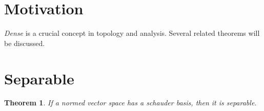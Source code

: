 \documentclass[12pt]{article}
\numberwithin{equation}{section}
\theoremstyle{plain} %
\newtheorem{theorem}[equation]{Theorem}
\theoremstyle{definition}
\theoremstyle{remark}
\begin{document}

\section{Motivation}
\textit{Dense} is a crucial concept in topology and analysis. Several related theorems will be discussed. 

\section{Separable}
\begin{theorem}
If a normed vector space has a \textit{schauder basis}, then it is \textit{separable}. 
\end{theorem}
\end{document}
